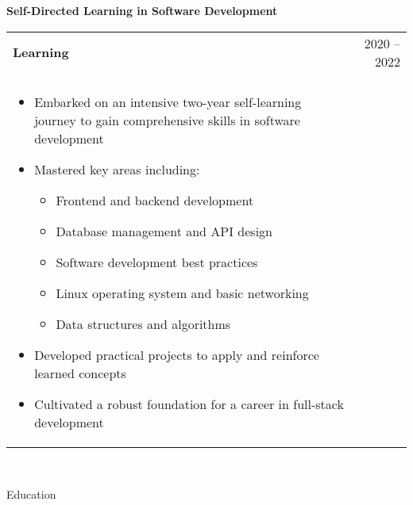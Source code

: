 \documentclass[a4paper,portrait,margin=0.5in]{article}
\begin{document}
\textbf{Self-Directed Learning in Software Development}\\
\begin{tabularx}{\textwidth}{@{}L R@{}}
  \toprule
  \textbf{Learning} & 2020 -- 2022\\\\

  \begin{minipage}[t]{\linewidth}
    \begin{itemize}
      \item Embarked on an intensive two-year self-learning journey to gain comprehensive skills in software development
      \item Mastered key areas including:
            \begin{itemize}
              \item Frontend and backend development
              \item Database management and API design
              \item Software development best practices
              \item Linux operating system and basic networking
              \item Data structures and algorithms
            \end{itemize}
      \item Developed practical projects to apply and reinforce learned concepts
      \item Cultivated a robust foundation for a career in full-stack development
    \end{itemize}
  \end{minipage}
\end{tabularx}\\


\begin{minipage}[t]{\linewidth}
  Education
\end{minipage}
\end{document}
